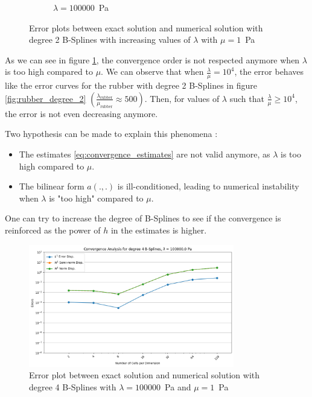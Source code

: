 \documentclass[a4paper,12pt,twoside]{report}
\begin{document}
\begin{figure}
\begin{subfigure}[b]{0.49\textwidth}
		\caption{$\lambda=100000$~Pa}
	\end{subfigure}
	\caption{Error plots between exact solution and numerical solution with degree 2 B-Splines with increasing values of $\lambda$ with $\mu = 1$~Pa}
	\label{fig:error_kappa}
\end{figure}

As we can see in figure \ref{fig:error_kappa}, the convergence order is not respected anymore when $\lambda$ is too high compared to $\mu$. We can observe that when $\frac{\lambda}{\mu} = 10^4$, the error behaves like the error curves for the rubber with degree 2 B-Splines in figure \ref{fig:rubber_degree_2} $\displaystyle \left(\frac{\lambda_{\text{rubber}}}{\mu_{\text{rubber}}} \approx 500\right)$. Then, for values of $\lambda$ such that $\frac{\lambda}{\mu} \geq 10^4$, the error is not even decreasing anymore.

Two hypothesis can be made to explain this phenomena : 
\begin{itemize}
	\item The estimates \eqref{eq:convergence_estimates} are not valid anymore, as $\lambda$ is too high compared to $\mu$.
	\item The bilinear form $a(.,.)$ is ill-conditioned, leading to numerical instability when $\lambda$ is "too high" compared to $\mu$.
\end{itemize}

One can try to increase the degree of B-Splines to see if the convergence is reinforced as the power of $h$ in the estimates is higher. 

\begin{figure}[!h]
	\centering
	\includegraphics[width=0.8\textwidth]{figures/figures_increasing_lambda_non_mixed/convergence_plot_degree_4_lambda=100000.0.png}	
	\caption{Error plot between exact solution and numerical solution with degree 4 B-Splines with $\lambda = 100000$~Pa and $\mu = 1$~Pa}
	\label{fig:error_kappa_degree_4}
\end{figure}
\end{document}
